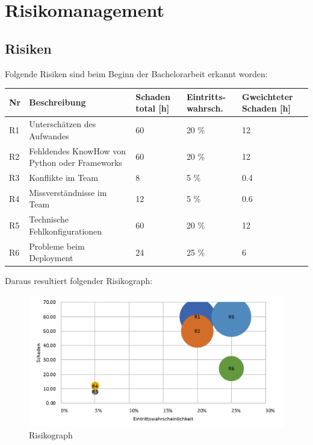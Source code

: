 \section{Risikomanagement}
\subsection{Risiken}
Folgende Risiken sind beim Beginn der Bachelorarbeit erkannt worden:

\renewcommand{\arraystretch}{1.2}
\begin{table}[h]
	\centering
	\begin{tabu} to 0.9
	\toprule
	Nr & Beschreibung & Schaden total [h] & Eintritts-wahrsch. & Gweichteter Schaden [h]\\ 
	\midrule
	R1 & Unterschätzen des Aufwandes & 60 & 20 \% & 12 \\
	R2 & Fehldendes KnowHow von \newline Python oder Frameworks & 60 & 20 \% & 12 \\
	R3 & Konflikte im Team & 8 & 5 \% & 0.4 \\
	R4 & Missverständnisse im Team & 12 & 5 \% & 0.6 \\
	R5 & Technische \newline Fehlkonfigurationen & 60 & 20 \% & 12 \\
	R6 & Probleme beim Deployment & 24 & 25 \% & 6 \\ 
	\bottomrule
	\end{tabu}
\end{table}

\medskip \noindent
Daraus resultiert folgender Risikograph: 
\begin{figure}[H]
	\includegraphics[width=\textwidth,height=\textheight,keepaspectratio]{images/risikoanalyse.png}
	\caption{Risikograph}
\end{figure}

